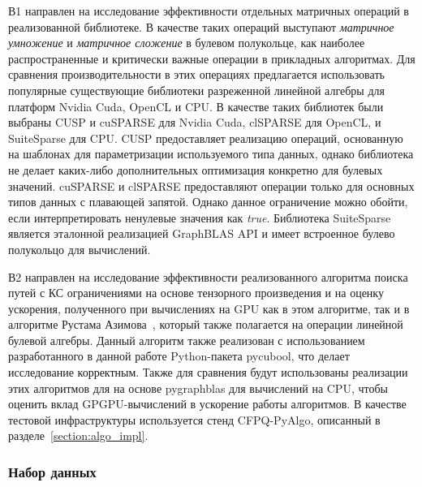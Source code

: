 В1 направлен на исследование эффективности отдельных матричных операций в реализованной библиотеке. В качестве таких операций выступают \textit{матричное умножение} и \textit{матричное сложение} в булевом полукольце, как наиболее распространенные и критически важные операции в прикладных алгоритмах. Для сравнения производительности в этих операциях предлагается использовать популярные существующие библиотеки разреженной линейной алгебры для платформ Nvidia Cuda, OpenCL и CPU. В качестве таких библиотек были выбраны CUSP и cuSPARSE для Nvidia Cuda, clSPARSE для OpenCL, и SuiteSparse для CPU. CUSP предоставляет реализацию операций, основанную на шаблонах для параметризации используемого типа данных, однако библиотека не делает каких-либо дополнительных оптимизация конкретно для булевых значений. cuSPARSE и clSPARSE предоставляют операции только для основных типов данных с плавающей запятой. Однако данное ограничение можно обойти, если интерпретировать ненулевые значения как \textit{true}. Библиотека SuiteSparse является эталонной реализацией GraphBLAS API и имеет встроенное булево полукольцо для вычислений.

В2 направлен на исследование эффективности реализованного алгоритма поиска путей с КС ограничениями на основе тензорного произведения и на оценку ускорения, полученного при вычислениях на GPU как в этом алгоритме, так и в алгоритме Рустама Азимова~\cite{inproceedings:cfqp_matrix_with_single_source}, который также полагается на операции линейной булевой алгебры. Данный алгоритм также реализован с использованием разработанного в данной работе Python-пакета pycubool, что делает исследование корректным. Также для сравнения будут использованы реализации этих алгоритмов для на основе pygraphblas для вычислений на CPU, чтобы оценить вклад GPGPU-вычислений в ускорение работы алгоритмов. В качестве тестовой инфраструктуры используется стенд CFPQ-PyAlgo, описанный в разделе~\ref{section:algo_impl}. 

\subsubsection*{Набор данных}

